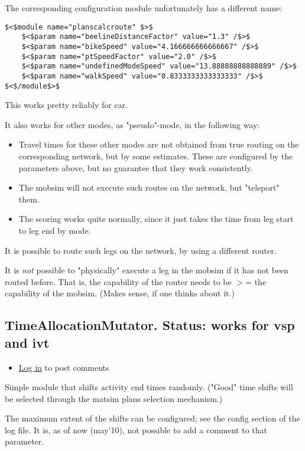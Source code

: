 \documentclass[a4paper,11pt]{report}
\begin{document}
The corresponding configuration module unfortunately has a different name:
\begin{verbatim}
$<$module name="planscalcroute" $>$
	$<$param name="beelineDistanceFactor" value="1.3" /$>$
	$<$param name="bikeSpeed" value="4.166666666666667" /$>$
	$<$param name="ptSpeedFactor" value="2.0" /$>$
	$<$param name="undefinedModeSpeed" value="13.88888888888889" /$>$
	$<$param name="walkSpeed" value="0.8333333333333333" /$>$
$<$/module$>$
\end{verbatim}

This works pretty reliably for car.

It also works for other modes, as "pseudo"-mode, in the following way:
\begin{itemize}
	\item Travel times for these other modes are not obtained from true  routing on the corresponding network, but by some estimates. These  are configured by the parameters above, but no guarantee that they work  consistently.
	\item The mobsim will not execute such routes on the network, but "teleport" them.
	\item The scoring works quite normally, since it just takes the time from leg start to leg end by mode.
\end{itemize}

It is possible to route such legs on the network, by using a different router.

It is \emph{not} possible to "physically" execute a leg in the  mobsim if it has not been routed before. That is, the capability  of the router needs to be $>$= the capability of the mobsim.  (Makes sense, if one thinks about it.)

\subsection{TimeAllocationMutator.  Status: works for vsp and ivt}
\begin{itemize}
	\item \href{http://www.matsim.org/user/login?destination=comment/reply/388%23comment-form}{Log in} to post comments
\end{itemize}

Simple  module that shifts activity end times randomly. ("Good" time  shifts will be selected through the matsim plans selection mechanism.)

The maximum extent of the shifts can be configured; see the config  section of the log file. It is, as of now (may'10), not possible  to add a comment to that parameter.
\end{document}
